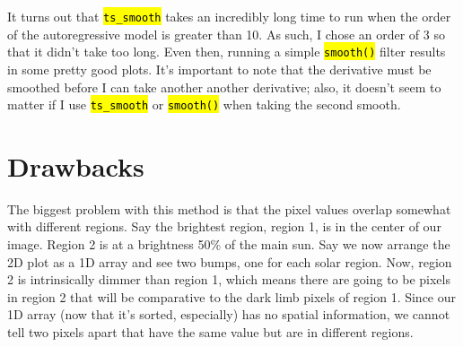 \documentclass[10pt]{scrartcl}
\begin{document}

It turns out that \texttt{\hl{ts\_smooth}} takes an incredibly long time to run when the order of the autoregressive model is greater than 10. As such, I chose an order of 3 so that it didn't take too long. Even then, running a simple \hl{\texttt{smooth()}} filter results in some pretty good plots. It's important to note that the derivative must be smoothed before I can take another another derivative; also, it doesn't seem to matter if I use \texttt{\hl{ts\_smooth}} or \hl{\texttt{smooth()}} when taking the second smooth.



\section{Drawbacks} %
\label{sec:drawbacks}
    
    The biggest problem with this method is that the pixel values overlap somewhat with different regions. Say the brightest region, region 1, is in the center of our image. Region 2 is at a brightness 50\% of the main sun. Say we now arrange the 2D plot as a 1D array and see two bumps, one for each solar region. Now, region 2 is intrinsically dimmer than region 1, which means there are going to be pixels in region 2 that will be comparative to the dark limb pixels of region 1. Since our 1D array (now that it's sorted, especially) has no spatial information, we cannot tell two pixels apart that have the same value but are in different regions. 
\end{document}
